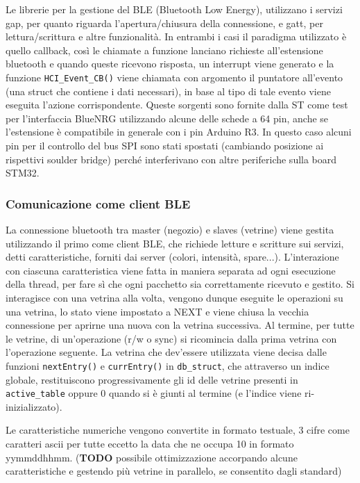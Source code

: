 Le librerie per la gestione del BLE (Bluetooth Low Energy), utilizzano i servizi gap, per quanto riguarda l'apertura/chiusura della connessione, e gatt, per lettura/scrittura e altre funzionalit\`a. In entrambi i casi il paradigma utilizzato \`e quello callback, cos\`i le chiamate a funzione lanciano richieste all'estensione bluetooth e quando queste ricevono risposta, un interrupt viene generato e la funzione \texttt{HCI\_Event\_CB()} viene chiamata con argomento il puntatore all'evento (una struct che contiene i dati necessari), in base al tipo di tale evento viene eseguita l'azione corrispondente. 
Queste sorgenti sono fornite dalla ST come test per l'interfaccia BlueNRG utilizzando alcune delle schede a 64 pin, anche se l'estensione \`e compatibile in generale con i pin Arduino R3. In questo caso alcuni pin per il controllo del bus SPI sono stati spostati (cambiando posizione ai rispettivi soulder bridge) perch\'e interferivano con altre periferiche sulla board STM32.

\subsubsection{Comunicazione come client BLE}


La connessione bluetooth tra master (negozio) e slaves (vetrine) viene gestita utilizzando il primo come client BLE, che richiede letture e scritture sui servizi, detti caratteristiche, forniti dai server (colori, intensit\`a, spare...). L'interazione con ciascuna caratteristica viene fatta in maniera separata ad ogni esecuzione della thread, per fare s\`i che ogni pacchetto sia correttamente ricevuto e gestito. Si interagisce con una vetrina alla volta, vengono dunque eseguite le operazioni su una vetrina, lo stato viene impostato a NEXT e viene chiusa la vecchia connessione per aprirne una nuova con la vetrina successiva. Al termine, per tutte le vetrine, di un'operazione (r/w o sync) si ricomincia dalla prima vetrina con l'operazione seguente. La vetrina che dev'essere utilizzata viene decisa dalle funzioni \texttt{nextEntry()} e \texttt{currEntry()} in \texttt{db\_struct}, che attraverso un indice globale, restituiscono progressivamente gli id delle vetrine presenti in \texttt{active\_table} oppure 0 quando si \`e giunti al termine (e l'indice viene ri-inizializzato). 

Le caratteristiche numeriche vengono convertite in formato testuale, 3 cifre come caratteri ascii per tutte eccetto la data che ne occupa 10 in formato yymmddhhmm. (\textbf{TODO} possibile ottimizzazione accorpando alcune caratteristiche e gestendo pi\`u vetrine in parallelo, se consentito dagli standard)


